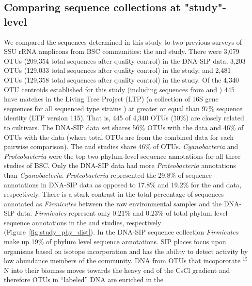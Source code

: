 \subsection{Comparing sequence collections at "study"-level}
We compared the sequences determined in this study to two previous surveys of
SSU rRNA amplicons from BSC communities: the \citet{Garcia_Pichel_2013}
and \citet{Steven_2013} study. There were 3,079 OTUs (209,354 total sequences
after quality control) in the DNA-SIP data, 3,203 OTUs (129,033 total sequences
after quality control) in the \citet{Garcia_Pichel_2013} study, and 2,481 OTUs
(129,358 total sequences after quality control) in the \citet{Steven_2013}
study. Of the 4,340 OTU centroids established for this study (including
sequences from \citet{Steven_2013} and \citet{Garcia_Pichel_2013}) 445 have
matches in the Living Tree Project (LTP) (a collection of 16S gene sequences
for all sequenced type strains \citep{Yarza_2008}) at greater or equal than
97\% sequence identity (LTP version 115). That is, 445 of 4,340 OTUs (\~10\%)
are closely related to cultivars. The DNA-SIP data set shares 56\% OTUs with
the \citet{Steven_2013} data and 46\% of OTUs with the
\citet{Garcia_Pichel_2013} data (where total OTUs are from the combined data
for each pairwise comparison).  The \citet{Steven_2013} and
\citet{Garcia_Pichel_2013} studies share 46\% of OTUs. \textit{Cyanobacteria}
and \textit{Proteobacteria} were the top two phylum-level sequence annotations
for all three studies of BSC. Only the DNA-SIP data had more
\textit{Proteobacteria} annotations than \textit{Cyanobacteria}.
\textit{Proteobacteria} represented the 29.8\% of sequence annotations in
DNA-SIP data as opposed to 17.8\% and 19.2\% for the \citet{Garcia_Pichel_2013}
and \citet{Steven_2013} data, respectively.  There is a stark contrast in the
total percentage of sequences annotated as \textit{Firmicutes} between the raw
environmental samples and the DNA-SIP data.  \textit{Firmicutes} represent only
0.21\% and 0.23\% of total phylum level sequence annotations in the
\citet{Steven_2013} and \citet{Garcia_Pichel_2013} studies, respectively
(Figure~\ref{fig:study_phy_dist}). In the DNA-SIP sequence collection
\textit{Firmicutes} make up 19\% of phylum level sequence annotations. SIP
places focus upon organisms based on isotope incorporation and has the ability
to detect activity by low abundance members of the community.  DNA from OTUs
that incopororate $^{15}$N into their biomass moves towards the heavy end of
the CsCl gradient and therefore OTUs in ``labeled'' DNA are enriched in the

